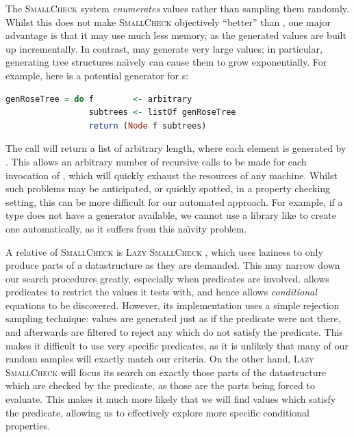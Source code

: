 The \textsc{SmallCheck} system \citep{runciman2008smallcheck} \emph{enumerates} values rather than sampling them randomly. Whilst this does not make \textsc{SmallCheck} objectively ``better'' than \qcheck{}, one major advantage is that it may use much less memory, as the generated values are built up incrementally. In contrast, \qcheck{} may generate very large values; in particular, generating tree structures na\"{\i}vely can cause them to grow exponentially. For example, here is a potential generator for s:

\begin{lstlisting}[language=Haskell, xleftmargin=0.1\textwidth, xrightmargin=0.1\textwidth]
genRoseTree = do f        <- arbitrary
                 subtrees <- listOf genRoseTree
                 return (Node f subtrees)
\end{lstlisting}

The  call will return a list of arbitrary length, where each element is generated by . This allows an arbitrary number of recursive calls to be made for each invocation of , which will quickly exhaust the resources of any machine. Whilst such problems may be anticipated, or quickly spotted, in a property checking setting, this can be more difficult for our automated approach. For example, if a type does not have a generator available, we cannot use a library like  to create one automatically, as it suffers from this na\"{\i}vity problem.

A relative of \textsc{SmallCheck} is \textsc{Lazy SmallCheck} \citep{reich2013advances}, which uses laziness to only produce parts of a datastructure as they are demanded. This may narrow down our search procedures greatly, especially when predicates are involved. \qcheck{} allows predicates to restrict the values it tests with, and hence allows \emph{conditional} equations to be discovered. However, its implementation uses a simple rejection sampling technique: values are generated just as if the predicate were not there, and afterwards are filtered to reject any which do not satisfy the predicate. This makes it difficult to use very specific predicates, as it is unlikely that many of our random samples will exactly match our criteria. On the other hand, \textsc{Lazy SmallCheck} will focus its search on exactly those parts of the datastructure which are checked by the predicate, as those are the parts being forced to evaluate. This makes it much more likely that we will find values which satisfy the predicate, allowing us to effectively explore more specific conditional properties.

